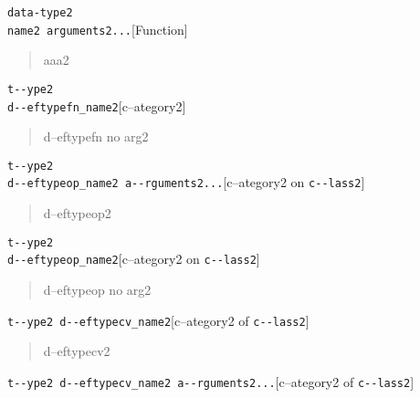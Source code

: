 \documentclass{book}
\begin{document}
\noindent\texttt{data-type2\leavevmode{}\\name2 arguments2...}\hfill[Function]



%
\begin{quote}
\unskip{\parskip=0pt\noindent}%
aaa2
\end{quote}

\noindent\texttt{t{-}{-}ype2\leavevmode{}\\d{-}{-}eftypefn\_name2}\hfill[c--ategory2]



%
\begin{quote}
\unskip{\parskip=0pt\noindent}%
d--eftypefn no arg2
\end{quote}

\noindent\texttt{t{-}{-}ype2\leavevmode{}\\d{-}{-}eftypeop\_name2 a{-}{-}rguments2...}\hfill[c--ategory2 on \texttt{c{-}{-}lass2}]



%
\begin{quote}
\unskip{\parskip=0pt\noindent}%
d--eftypeop2
\end{quote}

\noindent\texttt{t{-}{-}ype2\leavevmode{}\\d{-}{-}eftypeop\_name2}\hfill[c--ategory2 on \texttt{c{-}{-}lass2}]



%
\begin{quote}
\unskip{\parskip=0pt\noindent}%
d--eftypeop no arg2
\end{quote}

\noindent\texttt{t{-}{-}ype2 d{-}{-}eftypecv\_name2}\hfill[c--ategory2 of \texttt{c{-}{-}lass2}]



%
\begin{quote}
\unskip{\parskip=0pt\noindent}%
d--eftypecv2
\end{quote}

\noindent\texttt{t{-}{-}ype2 d{-}{-}eftypecv\_name2 a{-}{-}rguments2...}\hfill[c--ategory2 of \texttt{c{-}{-}lass2}]
\end{document}
